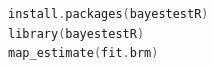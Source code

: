 \begin{lstlisting}[language=c++,label={code:27_05},caption={Displaying the results}]
install.packages(bayestestR)
library(bayestestR)
map_estimate(fit.brm)
\end{lstlisting}
